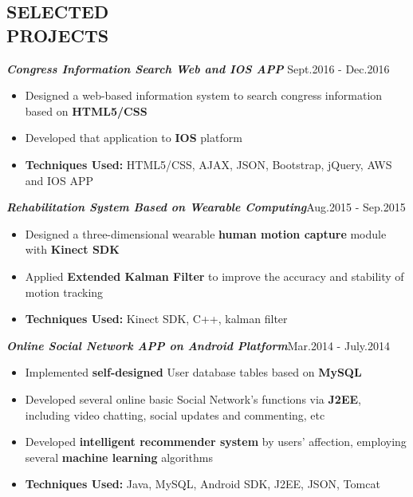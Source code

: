\documentclass[line,margin]{res}
\begin{document}
\begin{resume}
\section{SELECTED \\ PROJECTS}
           {\sl \textbf{Congress Information Search Web and IOS APP}}           \hfill Sept.2016 - Dec.2016 \\[1mm]
             \vspace{-5mm}
             \begin{itemize}
	\item Designed a web-based information system to search congress information based on \textbf{HTML5/CSS}
		\item Developed that application to \textbf{IOS} platform
		\item \textbf{Techniques Used:} HTML5/CSS, AJAX, JSON, Bootstrap, jQuery, AWS and IOS APP
             \end{itemize}
             \vspace{-3mm}
            {\sl \textbf{Rehabilitation System Based on Wearable Computing}}\hfill Aug.2015 - Sep.2015 \\[1mm]
            \vspace{-5mm}
             \begin{itemize}
	\item Designed a three-dimensional wearable \textbf{human motion capture} module with \textbf{Kinect SDK}
             \vspace{-1mm}
	\item Applied \textbf{Extended Kalman Filter} to improve the accuracy and stability of motion tracking
	\item \textbf{Techniques Used:} Kinect SDK, C++, kalman filter
             \end{itemize}
             \vspace{-3mm}
            {\sl \textbf{Online Social Network APP on Android Platform}}\hfill Mar.2014 - July.2014 \\[1mm]
            \vspace{-5mm}
            \begin{itemize}
	\item Implemented \textbf{self-designed} User database tables based on \textbf{MySQL}
            \vspace{-1mm}
	\item Developed several online basic Social Network's functions via \textbf{J2EE}, including video chatting, social updates and commenting, etc
	\item Developed \textbf{intelligent recommender system} by users' affection, employing several \textbf{machine learning} algorithms
	\item \textbf{Techniques Used:} Java, MySQL, Android SDK, J2EE, JSON, Tomcat

            \end{itemize}
\end{resume}
\end{document}
